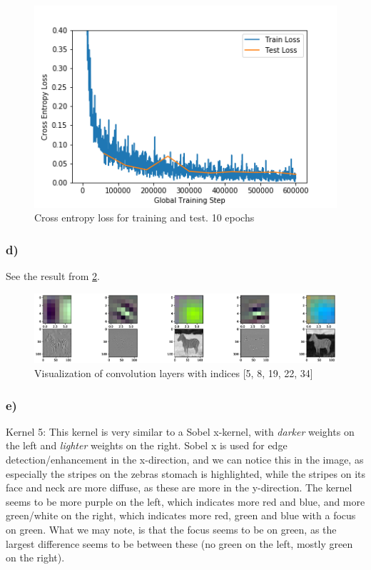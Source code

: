 \begin{figure}[]
    \centering
    \includegraphics[width=1.00\textwidth]{figures/image_processed/task2_c.png}
    \caption{Cross entropy loss for training and test. 10 epochs}
    \label{fig:task2c}
\end{figure}


\subsubsection*{d)}
See the result from \cref{fig:task2d}. 

\begin{figure}[]
    \centering
    \includegraphics[width=1.00\textwidth]{figures/task2d_image.eps}
    \caption{Visualization of convolution layers with indices [5, 8, 19, 22, 34]}
    \label{fig:task2d}
\end{figure}

\subsubsection*{e)}
Kernel 5: 
This kernel is very similar to a Sobel x-kernel, with \textit{darker} weights on the left and \textit{lighter} weights on the right. Sobel x is used for edge detection/enhancement in the x-direction, and we can notice this in the image, as especially the stripes on the zebras stomach is highlighted, while the stripes on its face and neck are more diffuse, as these are more in the y-direction. 
The kernel seems to be more purple on the left, which indicates more red and blue, and more green/white on the right, which indicates more red, green and blue with a focus on green. What we may note, is that the focus seems to be on green, as the largest difference seems to be between these (no green on the left, mostly green on the right). 


